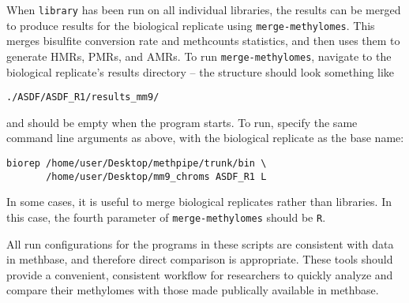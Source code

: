 \documentclass[10pt]{article}
\newcommand{\prog}[1]{\texttt{#1}}
\newcommand{\op}[1]{\texttt{#1}}
\begin{document}
When \prog{library} has been run on all individual libraries, the
results can be merged to produce results for the biological replicate using
\prog{merge-methylomes}. This merges bisulfite conversion rate and methcounts
statistics, and then uses them to generate HMRs, PMRs, and AMRs. To run
\prog{merge-methylomes}, navigate to the biological replicate's results
directory -- the structure should look something like
\begin{verbatim}
./ASDF/ASDF_R1/results_mm9/
\end{verbatim}
and should be empty when the program starts. To run, specify the same command
line arguments as above, with the biological replicate as the base name:
\begin{verbatim}
biorep /home/user/Desktop/methpipe/trunk/bin \
       /home/user/Desktop/mm9_chroms ASDF_R1 L
\end{verbatim}

In some cases, it is useful to merge biological replicates rather than
libraries. In this case, the fourth parameter of
\prog{merge-methylomes} should be \op{R}.

All run configurations for the programs in these scripts are
consistent with data in methbase, and therefore direct comparison is
appropriate. These tools should provide a convenient, consistent
workflow for researchers to quickly analyze and compare their
methylomes with those made publically available in methbase.



\end{document}
